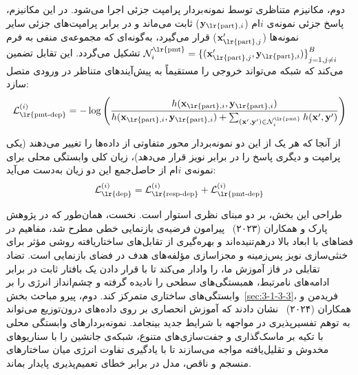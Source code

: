 دوم، مکانیزم متناظری توسط نمونه‌بردار پرامپت جزئی اجرا می‌شود. در این مکانیزم، پاسخ جزئی نمونه‌ی $i$ام ($\mathbf{y}_{\text{\lr{part}}, i}$) ثابت می‌ماند و در برابر پرامپت‌های جزئی سایر نمونه‌ها ($\mathbf{x}'_{\text{\lr{part}}, j}$) قرار می‌گیرد، به‌گونه‌ای که مجموعه‌ی منفی به فرم $\mathcal{N}^{\text{\lr{pmt}}}_i = {\{(\mathbf{x}'_{\text{\lr{part}}, j}, \mathbf{y}_{\text{\lr{part}}, i})\}}_{j=1, j \neq i}^B$ تشکیل می‌گردد. این تقابل تضمین می‌کند که شبکه می‌تواند خروجی را مستقیماً به پیش‌آیندهای متناظر در ورودی متصل سازد:
\begin{equation}\label{eq:chap4_loss_pmt_dep}
    \mathcal{L}_{\text{\lr{pmt-dep}}}^{(i)} = -\log \left( \frac{h(\mathbf{x}_{\text{\lr{part}}, i}, \mathbf{y}_{\text{\lr{part}}, i})}{h(\mathbf{x}_{\text{\lr{part}}, i}, \mathbf{y}_{\text{\lr{part}}, i}) + \sum_{(\mathbf{x}', \mathbf{y}') \in \mathcal{N}^{\text{\lr{pmt}}}_i} h(\mathbf{x}', \mathbf{y}')} \right)
\end{equation}

از آنجا که هر یک از این دو نمونه‌بردار محور متفاوتی از داده‌ها را تغییر می‌دهند (یکی پرامپت و دیگری پاسخ را در برابر نویز قرار می‌دهد)، زیان کلی وابستگی محلی برای نمونه‌ی $i$ام از حاصل‌جمع این دو زیان به‌دست می‌آید:
\begin{equation}\label{eq:chap4_loss_dep_total}
    \mathcal{L}_{\text{\lr{dep}}}^{(i)} = \mathcal{L}_{\text{\lr{resp-dep}}}^{(i)} + \mathcal{L}_{\text{\lr{pmt-dep}}}^{(i)}
\end{equation}

طراحی این بخش، بر دو مبنای نظری استوار است. نخست، همان‌طور که در پژوهش پارک و همکاران (۲۰۲۳)~\cite{park2023thelinear} پیرامون فرضیه‌ی بازنمایی خطی مطرح شد، مفاهیم در فضاهای با ابعاد بالا درهم‌تنیده‌اند و بهره‌گیری از تقابل‌های ساختاریافته روشی مؤثر برای خنثی‌سازی نویز پس‌زمینه و مجزاسازی مؤلفه‌های هدف در فضای بازنمایی است. تضاد تقابلی در فاز آموزش ما،  را وادار می‌کند تا با قرار دادن یک بافتار ثابت در برابر ادامه‌های نامرتبط، همبستگی‌های سطحی را نادیده گرفته و چشم‌انداز انرژی را بر وابستگی‌های ساختاری متمرکز کند. دوم، پیرو مباحث بخش~\ref{sec:3-1-3-3}، فریدمن و همکاران (۲۰۲۴)~\cite{friedman2024interpretability} نشان دادند که آموزش انحصاری بر روی داده‌های درون‌توزیع می‌تواند به توهم تفسیرپذیری در مواجهه با شرایط جدید بینجامد. نمونه‌بردارهای وابستگی محلی با تکیه بر ماسک‌گذاری و جفت‌سازی‌های متنوع، شبکه‌ی جانشین را با سناریوهای مخدوش و تقلیل‌یافته مواجه می‌سازند تا با یادگیری تفاوت انرژی میان ساختارهای منسجم و ناقص، مدل در برابر خطای تعمیم‌پذیری پایدار بماند.

